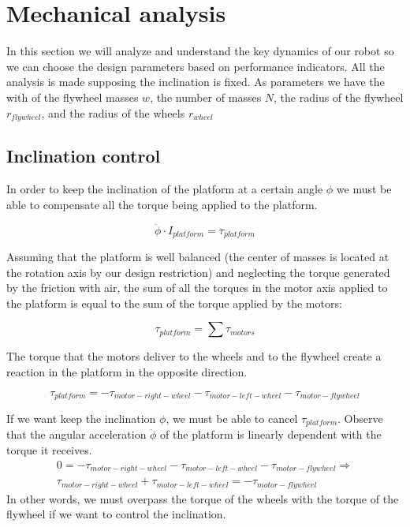 \section{Mechanical analysis}
In this section we will analyze and understand the key dynamics of our robot so we can choose
the design parameters based on performance indicators. All the analysis is made
supposing the inclination is fixed. As parameters we have the with of the
flywheel masses $w$, the number of masses $N$, the radius of the flywheel $r_{flywheel}$, and
the radius of the wheels $r_{wheel}$

\subsection{Inclination control}
In order to keep the inclination of the platform at a certain angle $\phi$ 
we must be able to compensate all the torque being applied to the platform.

\[\ddot{\phi}\cdot I_{platform} = \tau_{platform} \]

Assuming that the platform is well balanced (the center of masses is located
at the rotation axis by our design restriction) and neglecting the torque generated
by the friction
with air, the sum of all the torques in the motor axis applied to the platform
is equal to the sum of the torque applied by the motors:

\[\tau_{platform} = \sum \tau_{motors}\]

The torque that the motors deliver to the wheels and to the flywheel create
a reaction in the platform in the opposite direction.

\[\tau_{platform} = -\tau_{motor-right-wheel} -\tau_{motor-left-wheel} -\tau_{motor-flywheel} \]

If we want keep the inclination $\phi$, we must be able to cancel $\tau_{platform}$.
Observe that the angular acceleration $\ddot{\phi}$ of the platform is linearly 
dependent with the torque it receives. 
\begin{equation} \label{eq:control equation}
\begin{split}
0 = -\tau_{motor-right-wheel} -\tau_{motor-left-wheel} -\tau_{motor-flywheel} \Rightarrow \\
\tau_{motor-right-wheel} +\tau_{motor-left-wheel} = -\tau_{motor-flywheel}
\end{split}
\end{equation}
In other words, we must overpass the torque of the wheels with the torque of the flywheel
if we want to control the inclination.

